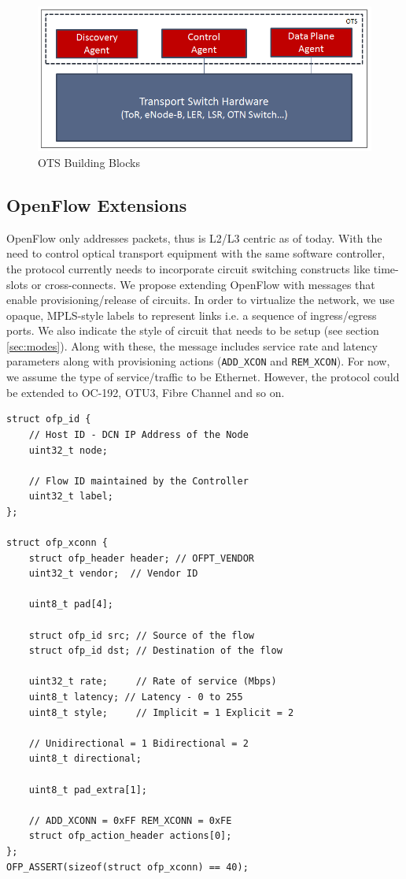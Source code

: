 \documentclass{sig-alternate-2013}
\begin{document}
	\begin{figure}[htb]
	\centering
	\includegraphics[scale=0.37]{OTSArch.png}
	\caption{OTS Building Blocks}
	\label{fig:OTSArch}
	\end{figure}

	\subsection{OpenFlow Extensions}
	\label{sec:ofext}
	
	OpenFlow \cite{OF1.0} only addresses packets, thus is L2/L3 centric as of today. With the need to control optical transport
	equipment with the same software controller, the protocol currently needs to incorporate circuit switching constructs like time-slots or
	cross-connects. We propose extending OpenFlow with messages that enable provisioning/release of
	circuits. In order to virtualize the network, we use opaque, MPLS-style labels to represent links i.e. a sequence of ingress/egress ports. We also indicate the style of circuit that needs to be setup (see
	section \ref{sec:modes}). Along with these, the message includes service rate and latency parameters along
	with provisioning actions (\texttt{ADD\_XCON} and \texttt{REM\_XCON}). For now, we assume the type of service/traffic 
	to be Ethernet. However, the protocol could be extended to OC-192, OTU3, Fibre Channel and so on.


	\begin{lstlisting}
struct ofp_id {
	// Host ID - DCN IP Address of the Node
	uint32_t node;

	// Flow ID maintained by the Controller
	uint32_t label;
};

struct ofp_xconn {
	struct ofp_header header; // OFPT_VENDOR
	uint32_t vendor;  // Vendor ID

	uint8_t pad[4];
		  
	struct ofp_id src; // Source of the flow
	struct ofp_id dst; // Destination of the flow
		   
	uint32_t rate;     // Rate of service (Mbps)
	uint8_t latency; // Latency - 0 to 255
	uint8_t style;     // Implicit = 1 Explicit = 2

	// Unidirectional = 1 Bidirectional = 2
	uint8_t directional;

	uint8_t pad_extra[1];

	// ADD_XCONN = 0xFF REM_XCONN = 0xFE
	struct ofp_action_header actions[0];
};
OFP_ASSERT(sizeof(struct ofp_xconn) == 40);
	\end{lstlisting}
\end{document}
